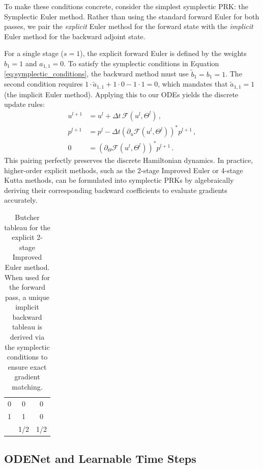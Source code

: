 \begin{exm}
To make these conditions concrete, consider the simplest symplectic PRK: the Symplectic Euler method. Rather than using the standard forward Euler for both passes, we pair the \emph{explicit} Euler method for the forward state with the \emph{implicit} Euler method for the backward adjoint state. 

For a single stage ($s=1$), the explicit forward Euler is defined by the weights $b_1 = 1$ and $a_{1,1} = 0$. To satisfy the symplectic conditions in Equation \eqref{eq:symplectic_conditions}, the backward method must use $\tilde{b}_1 = b_1 = 1$. The second condition requires $1 \cdot \tilde{a}_{1,1} + 1 \cdot 0 - 1 \cdot 1 = 0$, which mandates that $\tilde{a}_{1,1} = 1$ (the implicit Euler method). Applying this to our ODEs yields the discrete update rules:
\begin{align*}
    u^{l+1} &= u^l + \Delta t \, \mathcal{F}(u^l, \Theta^l) \, , \\
    p^{l+1} &= p^l - \Delta t \left(\partial_u \mathcal{F}(u^l, \Theta^l)\right)^* p^{l+1} \, , \\
    0 &= \left(\partial_\Theta \mathcal{F}(u^l, \Theta^l)\right)^* p^{l+1} \, .
\end{align*}
This pairing perfectly preserves the discrete Hamiltonian dynamics. In practice, higher-order explicit methods, such as the 2-stage Improved Euler or 4-stage Kutta methods, can be formulated into symplectic PRKs by algebraically deriving their corresponding backward coefficients to evaluate gradients accurately.
\end{exm}

\begin{table}[htpb]
    \centering
    \begin{tabular}{c|cc}
    0 & 0 & 0 \\ 
    1 & 1 & 0 \\ \hline
      & 1/2 & 1/2
    \end{tabular}
    \caption{Butcher tableau for the explicit 2-stage Improved Euler method. When used for the forward pass, a unique implicit backward tableau is derived via the symplectic conditions to ensure exact gradient matching.}
    \label{tab:improved_euler}
\end{table}

\subsection{ODENet and Learnable Time Steps}

